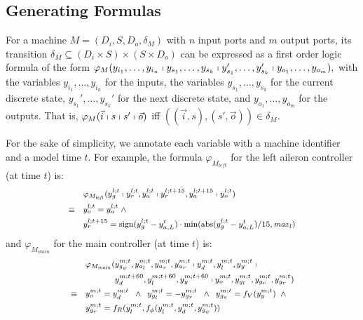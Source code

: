 \documentclass{sig-alternate}
\newcommand{\abs}{\ensuremath{\mathrm{abs}}}
\newcommand{\sign}{\ensuremath{\mathrm{sign}}}
\begin{document}
\subsection{Generating Formulas}

For a machine  $M = (D_i,S,D_o,\delta_M)$
with $n$ input ports and $m$ output ports,
its transition $\delta_M \subseteq (D_i \times S) \times (S \times D_o)$
can be expressed as a first order logic formula of the form
$\varphi_{M}(y_{i_1},\ldots,y_{i_n}\shortmid
y_{s_1},\ldots,y_{s_k}\shortmid
y_{s_1}',\ldots,y_{s_k}'\shortmid
y_{o_1},\ldots,y_{o_m}),
$ with
the variables $y_{i_1},\ldots,y_{i_n}$ for the inputs,
the variables $y_{s_1},\ldots,y_{s_k}$  for the current discrete state, 
$y_{s_1}',\ldots,y_{s_k}'$  for the next discrete state, and 
$y_{o_1},\ldots,y_{o_m}$  for the outputs.
That is,
$\varphi_{M}(\vec{i}\shortmid s\shortmid s'\shortmid  \vec{o})$
iff $( (\vec{i}, s), (s', \vec{o}) ) \in \delta_{M}$.

For the sake of simplicity, 
we annotate each variable with 
a machine identifier and a model time $t$. %
For example, the formula $\varphi_{M_\mathit{left}}$
for the left aileron controller (at time $t$) is:
\[
\begin{medsize}
\begin{aligned}
&
\varphi_{M_\mathit{left}}(y_{g}^{l;t} \shortmid  y_{r}^{l;t}, y_{a}^{l;t} 
	\shortmid y_{r}^{l;t + 15}, y_{a}^{l;t + 15} \shortmid y_{o}^{l;t})
\\
\equiv\quad
&
y_{o}^{l;t} = y_{a}^{l;t} \;\wedge
\\
&
y_{r}^{l;t + 15} = \sign(y_{g}^{l;t} - y_{a,L}^{t}) \cdot \min(\abs(y_{g}^{l;t} - y_{a,L}^{t}) / 15, \mathit{max}_l)
\end{aligned}
\end{medsize}
\]
and $\varphi_{M_\mathit{main}}$ for the main controller (at time $t$) is:
\[
\begin{medsize}
\begin{aligned}
&
\begin{aligned}
\varphi_{M_\mathit{main}}(
	&y_{\mathit{g}_\psi}^{m;t}, y_{a_l}^{m;t}, y_{a_v}^{m;t}, y_{a_r}^{m;t}  \shortmid
	y_d^{m;t}, y_l^{m;t}, y_y^{m;t} \shortmid
\\
	&y_d^{m;t+60}, y_l^{m;t+60}, y_y^{m;t+60} \shortmid
	y_o^{m;t}, y_{g_l}^{m;t}, y_{g_v}^{m;t}, y_{g_r}^{m;t})
\end{aligned}
\\
\equiv\quad
&
y_o^{m;t} = y_d^{m;t} 
\;\;\wedge\;\;
y_{g_l}^{m;t} = - y_{g_r}^{m;t}
\;\;\wedge\;\;
y_{g_v}^{m;t} = f_V(y_y^{m;t})
\;\;\wedge\;\;
\\
&
y_{g_r}^{m;t} = f_{R}(y_l^{m;t}, f_\phi(y_l^{m;t}, y_d^{m;t}, y_{\mathit{g}_\psi}^{m;t}))
\end{aligned}
\end{medsize}
\]
\end{document}
